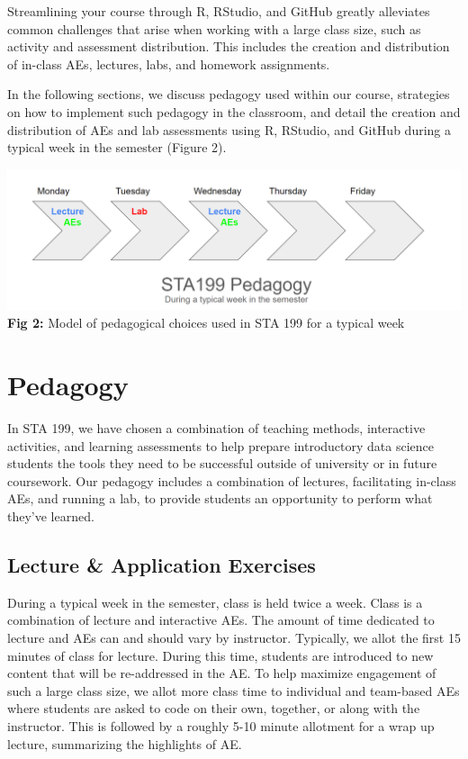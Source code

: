 \documentclass[
  12pt]{article}
\begin{document}
Streamlining your course through R, RStudio, and GitHub greatly
alleviates common challenges that arise when working with a large class
size, such as activity and assessment distribution. This includes the
creation and distribution of in-class AEs, lectures, labs, and homework
assignments.

In the following sections, we discuss pedagogy used within our course,
strategies on how to implement such pedagogy in the classroom, and
detail the creation and distribution of AEs and lab assessments using R,
RStudio, and GitHub during a typical week in the semester (Figure 2).

\includegraphics{images/pedagogy.png} \textbf{Fig 2:} Model of
pedagogical choices used in STA 199 for a typical week

\hypertarget{sec-ped}{%
\section{Pedagogy}\label{sec-ped}}

In STA 199, we have chosen a combination of teaching methods,
interactive activities, and learning assessments to help prepare
introductory data science students the tools they need to be successful
outside of university or in future coursework. Our pedagogy includes a
combination of lectures, facilitating in-class AEs, and running a lab,
to provide students an opportunity to perform what they've learned.

\hypertarget{lecture-application-exercises}{%
\subsection{Lecture \& Application
Exercises}\label{lecture-application-exercises}}

During a typical week in the semester, class is held twice a week. Class
is a combination of lecture and interactive AEs. The amount of time
dedicated to lecture and AEs can and should vary by instructor.
Typically, we allot the first 15 minutes of class for lecture. During
this time, students are introduced to new content that will be
re-addressed in the AE. To help maximize engagement of such a large
class size, we allot more class time to individual and team-based AEs
where students are asked to code on their own, together, or along with
the instructor. This is followed by a roughly 5-10 minute allotment for
a wrap up lecture, summarizing the highlights of AE.
\end{document}
